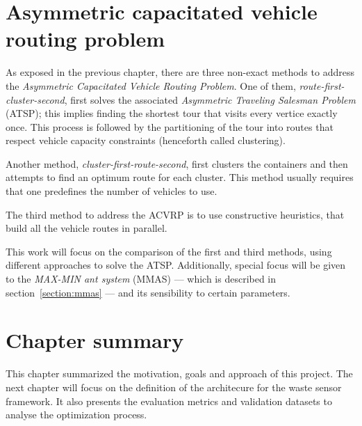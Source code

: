 \section{Asymmetric capacitated vehicle routing problem}
\label{section:problem-cvrp}

As exposed in the previous chapter, there are three non-exact methods to address
the \textit{Asymmetric Capacitated Vehicle Routing Problem}. One of them,
\textit{route-first-cluster-second}, first solves the associated
\textit{Asymmetric Traveling Salesman Problem} (ATSP); this implies finding the
shortest tour that visits every vertice exactly once. This process is followed
by the partitioning of the tour into routes that respect vehicle capacity
constraints (henceforth called clustering).

Another method, \textit{cluster-first-route-second}, first clusters the
containers and then attempts to find an optimum route for each cluster. This
method usually requires that one predefines the number of vehicles to use.

The third method to address the ACVRP is to use constructive heuristics, that
build all the vehicle routes in parallel.

This work will focus on the comparison of the first and third methods, using
different approaches to solve the ATSP. Additionally, special focus will be
given to the \textit{MAX-MIN ant system} (MMAS) --- which is described in
section~\ref{section:mmas} --- and its sensibility to certain parameters.

\section{Chapter summary}

This chapter summarized the motivation, goals and approach of this project. The
next chapter will focus on the definition of the architecure for the waste
sensor framework. It also presents the evaluation metrics and validation
datasets to analyse the optimization process.


